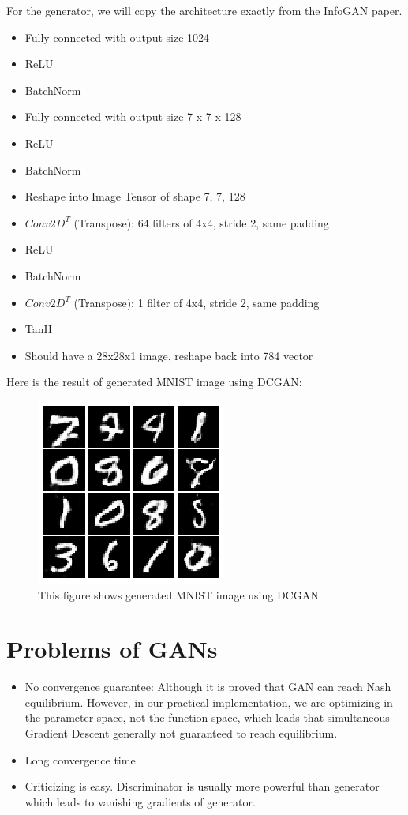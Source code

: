 \documentclass[10pt,twocolumn,letterpaper]{article}
\begin{document}
For the generator, we will copy the architecture exactly from the InfoGAN\cite{DBLP:journals/corr/ChenDHSSA16} paper. 
\begin{itemize}
    \item Fully connected with output size 1024
    \item ReLU
    \item BatchNorm
    \item Fully connected with output size 7 x 7 x 128 
    \item ReLU
    \item BatchNorm
    \item Reshape into Image Tensor of shape 7, 7, 128
    \item $Conv2D^T$ (Transpose): 64 filters of 4x4, stride 2, same padding
    \item ReLU
    \item BatchNorm
    \item $Conv2D^T$ (Transpose): 1 filter of 4x4, stride 2, same padding
    \item TanH
    \item Should have a 28x28x1 image, reshape back into 784 vector
\end{itemize}
Here is the result of generated MNIST image using DCGAN: 
\begin{figure}[htpb]
\begin{center}
   \includegraphics[scale=1]{images/dcgan.png}
\end{center}
   \caption{\footnotesize This figure shows generated MNIST image using DCGAN}
\end{figure}


\section{Problems of GANs}
\begin{itemize}
    \item No convergence guarantee: Although it is proved that GAN can reach Nash equilibrium. However, in our practical implementation, we are optimizing in the parameter space, not the function space, which leads that simultaneous Gradient Descent generally not guaranteed to reach equilibrium.
    \item Long convergence time.
    \item Criticizing is easy. Discriminator is usually more powerful than generator which leads to vanishing gradients of generator\cite{arjovsky2017towards}.
\end{itemize}

{\small


}
\end{document}
